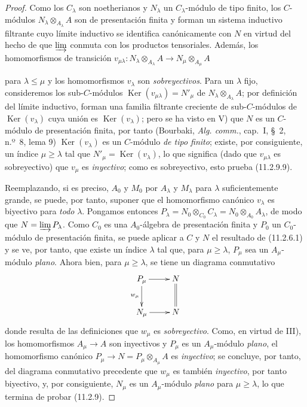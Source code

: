 \begin{proof}
Como los $C_\lambda$ son noetherianos y $N_\lambda$ un $C_\lambda$-módulo
de tipo finito, los $C$-módulos $N_\lambda\otimes_{A_\lambda}A$ son de
presentación finita y forman un sistema inductivo filtrante cuyo límite
inductivo se identifica canónicamente con $N$ en virtud del hecho de que $\varinjlim$
conmuta con los productos tensoriales. Además, los homomorfismos de transición
$v_{\mu\lambda}:N_\lambda\otimes_{A_\lambda}A
\to N_\mu\otimes_{A_\mu}A$




para $\lambda\leq\mu$ y los homomorfismos $v_\lambda$ son \emph{sobreyectivos}.
Para un $\lambda$ fijo, consideremos los sub-$C$-módulos
$\operatorname{Ker}(v_{\mu\lambda})=N'_\mu$ de $N_\lambda\otimes_{A_\lambda}A$; por
definición del límite inductivo, forman una familia filtrante creciente
de sub-$C$-módulos de $\operatorname{Ker}(v_\lambda)$ cuya unión es
$\operatorname{Ker}(v_\lambda)$; pero se ha visto en V) que $N$ es un $C$-módulo de
presentación finita, por tanto (Bourbaki, \emph{Alg. comm.}, cap.~I, \S~2,
n.º~8, lema 9) $\operatorname{Ker}(v_\lambda)$ es un $C$-módulo \emph{de tipo finito}; existe,
por consiguiente, un índice $\mu\geq\lambda$ tal que
$N'_\mu=\operatorname{Ker}(v_\lambda)$, lo que significa (dado que $v_{\mu\lambda}$ es
sobreyectivo) que $v_\mu$ es \emph{inyectivo}; como es sobreyectivo, esto
prueba (11.2.9.9).

Reemplazando, si es preciso, $A_0$ y $M_0$ por $A_\lambda$ y $M_\lambda$ para
$\lambda$ suficientemente grande, se puede, por tanto, suponer que el homomorfismo canónico
$v_\lambda$ es biyectivo para \emph{todo} $\lambda$. Pongamos entonces
$P_\lambda=N_0\otimes_{C_0}C_\lambda=N_0\otimes_{A_0}A_\lambda$, de modo que
$N=\varinjlim P_\lambda$. Como $C_0$ es una $A_0$-álgebra de presentación
finita y $P_0$ un $C_0$-módulo de presentación finita, se puede aplicar a
$C$ y $N$ el resultado de (11.2.6.1) y se ve, por tanto, que existe un índice
$\lambda$ tal que, para $\mu\geq\lambda$, $P_\mu$ sea un $A_\mu$-módulo
\emph{plano}. Ahora bien, para $\mu\geq\lambda$, se tiene un diagrama conmutativo
\[
\xymatrix{
P_\mu \ar[r] \ar[d]_{w_\mu} & N \ar@{=}[d] \\
N_\mu \ar[r] & N
}
\]
donde resulta de las definiciones que $w_\mu$ es \emph{sobreyectivo}. Como, en
virtud de III), los homomorfismos $A_\mu\to A$ son inyectivos y $P_\mu$
es un $A_\mu$-módulo \emph{plano}, el homomorfismo canónico
$P_\mu\to N=P_\mu\otimes_{A_\mu}A$ es \emph{inyectivo}; se concluye, por tanto, del
diagrama conmutativo precedente que $w_\mu$ es también \emph{inyectivo}, por tanto biyectivo,
y, por consiguiente, $N_\mu$ es un $A_\mu$-módulo \emph{plano} para $\mu\geq\lambda$, lo que
termina de probar (11.2.9).
\end{proof}


